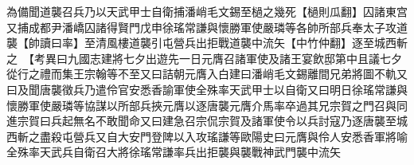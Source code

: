 為備聞道襲召兵乃以天武甲士自衛捕潘峭毛文錫至檛之幾死【檛則瓜翻】囚諸東宫又捕成都尹潘嶠囚諸得賢門戊申徐瑤常謙與懷勝軍使嚴璘等各帥所部兵奉太子攻道襲【帥讀曰率】至清風樓道襲引屯營兵出拒戰道襲中流矢【中竹仲翻】逐至城西斬之　【考異曰九國志建將七夕出遊先一日元膺召諸軍使及諸王宴飲邸第中且議七夕從行之禮而集王宗翰等不至又曰詰朝元膺入白建曰潘峭毛文錫離間兄弟將圖不軌又曰及聞唐襲徵兵乃遣伶官安悉香諭軍使全殊率天武甲士以自衛又曰明日徐瑤常謙與懷勝軍使嚴璘等協謀以所部兵挾元膺以逐唐襲元膺介馬率卒過其兄宗賀之門召與同進宗賀曰兵起無名不敢聞命又曰建急召宗侃宗賀及諸軍使令以兵討寇乃逐唐襲至城西斬之盡殺屯營兵又自大安門登陴以入攻瑤謙等歐陽史曰元膺與伶人安悉香軍將喻全殊率天武兵自衛召大將徐瑤常謙率兵出拒襲與襲戰神武門襲中流矢